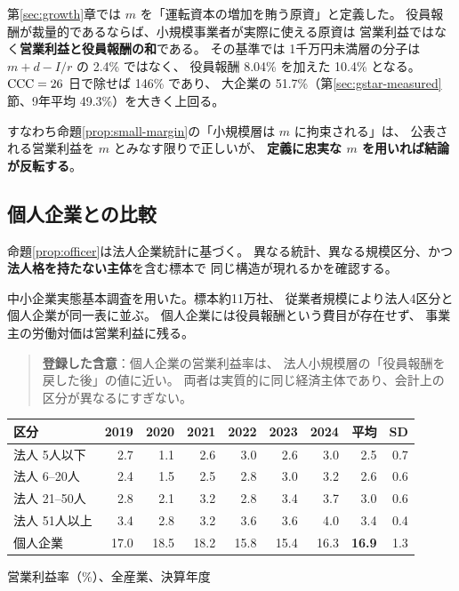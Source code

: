 \begin{remark}[$m$ の定義との齟齬]
第\ref{sec:growth}章では $m$ を「運転資本の増加を賄う原資」と定義した。
役員報酬が裁量的であるならば、小規模事業者が実際に使える原資は
営業利益ではなく\textbf{営業利益と役員報酬の和}である。
その基準では 1千万円未満層の分子は $m+d-I/r$ の 2.4\% ではなく、
役員報酬 8.04\% を加えた 10.4\% となる。
$\mathrm{CCC}=26$ 日で除せば 146\% であり、
大企業の 51.7\%（第\ref{sec:gstar-measured}節、9年平均 49.3\%）を大きく上回る。

すなわち命題\ref{prop:small-margin}の「小規模層は $m$ に拘束される」は、
公表される営業利益を $m$ とみなす限りで正しいが、
\textbf{定義に忠実な $m$ を用いれば結論が反転する}。
\end{remark}

\subsection{個人企業との比較}
\label{sec:individual-firms}

命題\ref{prop:officer}は法人企業統計に基づく。
異なる統計、異なる規模区分、かつ\textbf{法人格を持たない主体}を含む標本で
同じ構造が現れるかを確認する。

中小企業実態基本調査を用いた。標本約11万社、
従業者規模により法人4区分と個人企業が同一表に並ぶ。
個人企業には役員報酬という費目が存在せず、
事業主の労働対価は営業利益に残る。

\begin{quote}
\textbf{登録した含意}：個人企業の営業利益率は、
法人小規模層の「役員報酬を戻した後」の値に近い。
両者は実質的に同じ経済主体であり、会計上の区分が異なるにすぎない。
\end{quote}

\begin{center}
\begin{tabular}{@{}lrrrrrrrr@{}}
\toprule
区分 & 2019 & 2020 & 2021 & 2022 & 2023 & 2024 & 平均 & SD \\
\midrule
法人 5人以下 & 2.7 & 1.1 & 2.6 & 3.0 & 2.6 & 3.0 & 2.5 & 0.7 \\
法人 6--20人 & 2.4 & 1.5 & 2.5 & 2.8 & 3.0 & 3.2 & 2.6 & 0.6 \\
法人 21--50人 & 2.8 & 2.1 & 3.2 & 2.8 & 3.4 & 3.7 & 3.0 & 0.6 \\
法人 51人以上 & 3.4 & 2.8 & 3.2 & 3.6 & 3.6 & 4.0 & 3.4 & 0.4 \\
個人企業 & 17.0 & 18.5 & 18.2 & 15.8 & 15.4 & 16.3 & \textbf{16.9} & 1.3 \\
\bottomrule
\end{tabular}
\label{tab:individual-vs-corp-margin}
\end{center}
\begin{center}\footnotesize 営業利益率（\%）、全産業、決算年度\end{center}

